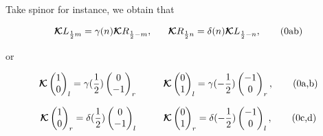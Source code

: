 \documentclass[12pt]{beamer}
\newcommand{\stag}[1]{\tag{\arabic{equation}#1}}
\newcommand{\Kappa}[0]{\bm{\mathcal{K}}}
\begin{document}
\begin{frame}
Take spinor for instance, we obtain that

\addtocounter{equation}{1}
\begin{align*}
\Kappa L_{\frac{1}{2} m}=\gamma(n)\Kappa R_{\frac{1}{2} -m}, ~~~~~
\Kappa R_{\frac{1}{2} n}=\delta(n)\Kappa L_{\frac{1}{2} -n}, \stag{ab}
\end{align*}

\noindent or

\addtocounter{equation}{1}
\begin{align*}
\Kappa \begin{pmatrix}1\\0\end{pmatrix}_l=\gamma(\frac{1}{2})\begin{pmatrix}0\\-1\end{pmatrix}_{r}~~~~~~~~
\Kappa \begin{pmatrix}0\\1\end{pmatrix}_l=\gamma(-\frac{1}{2})\begin{pmatrix}-1\\0\end{pmatrix}_{r},  \stag{a,b}
\end{align*}

\begin{align*}
\Kappa \begin{pmatrix}1\\0\end{pmatrix}_r=\delta(\frac{1}{2})\begin{pmatrix}0\\-1\end{pmatrix}_{l}~~~~~~~~
\Kappa \begin{pmatrix}0\\1\end{pmatrix}_r=\delta(-\frac{1}{2})\begin{pmatrix}-1\\0\end{pmatrix}_{l},  \stag{c,d}
\end{align*}
\end{frame}
\end{document}

